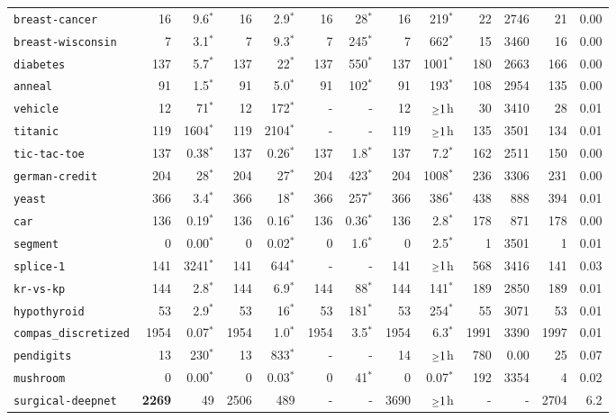 \begin{tabular}{lrrrrrrrrrrrr}
\texttt{breast-cancer} & 16 & 9.6$^*$ & 16 & 2.9$^*$ & 16 & 28$^*$ & 16 & 219$^*$ & 22 & 2746 & 21 & 0.00\\
\texttt{breast-wisconsin} & 7 & 3.1$^*$ & 7 & 9.3$^*$ & 7 & 245$^*$ & 7 & 662$^*$ & 15 & 3460 & 16 & 0.00\\
\texttt{diabetes} & 137 & 5.7$^*$ & 137 & 22$^*$ & 137 & 550$^*$ & 137 & 1001$^*$ & 180 & 2663 & 166 & 0.00\\
\texttt{anneal} & 91 & 1.5$^*$ & 91 & 5.0$^*$ & 91 & 102$^*$ & 91 & 193$^*$ & 108 & 2954 & 135 & 0.00\\
\texttt{vehicle} & 12 & 71$^*$ & 12 & 172$^*$ & - & - & 12 & $\mathsmaller{\geq}1$h & 30 & 3410 & 28 & 0.01\\
\texttt{titanic} & 119 & 1604$^*$ & 119 & 2104$^*$ & - & - & 119 & $\mathsmaller{\geq}1$h & 135 & 3501 & 134 & 0.01\\
\texttt{tic-tac-toe} & 137 & 0.38$^*$ & 137 & 0.26$^*$ & 137 & 1.8$^*$ & 137 & 7.2$^*$ & 162 & 2511 & 150 & 0.00\\
\texttt{german-credit} & 204 & 28$^*$ & 204 & 27$^*$ & 204 & 423$^*$ & 204 & 1008$^*$ & 236 & 3306 & 231 & 0.00\\
\texttt{yeast} & 366 & 3.4$^*$ & 366 & 18$^*$ & 366 & 257$^*$ & 366 & 386$^*$ & 438 & 888 & 394 & 0.01\\
\texttt{car} & 136 & 0.19$^*$ & 136 & 0.16$^*$ & 136 & 0.36$^*$ & 136 & 2.8$^*$ & 178 & 871 & 178 & 0.00\\
\texttt{segment} & 0 & 0.00$^*$ & 0 & 0.02$^*$ & 0 & 1.6$^*$ & 0 & 2.5$^*$ & 1 & 3501 & 1 & 0.01\\
\texttt{splice-1} & 141 & 3241$^*$ & 141 & 644$^*$ & - & - & 141 & $\mathsmaller{\geq}1$h & 568 & 3416 & 141 & 0.03\\
\texttt{kr-vs-kp} & 144 & 2.8$^*$ & 144 & 6.9$^*$ & 144 & 88$^*$ & 144 & 141$^*$ & 189 & 2850 & 189 & 0.01\\
\texttt{hypothyroid} & 53 & 2.9$^*$ & 53 & 16$^*$ & 53 & 181$^*$ & 53 & 254$^*$ & 55 & 3071 & 53 & 0.01\\
\texttt{compas\_discretized} & 1954 & 0.07$^*$ & 1954 & 1.0$^*$ & 1954 & 3.5$^*$ & 1954 & 6.3$^*$ & 1991 & 3390 & 1997 & 0.01\\
\texttt{pendigits} & 13 & 230$^*$ & 13 & 833$^*$ & - & - & 14 & $\mathsmaller{\geq}1$h & 780 & 0.00 & 25 & 0.07\\
\texttt{mushroom} & 0 & 0.00$^*$ & 0 & 0.03$^*$ & 0 & 41$^*$ & 0 & 0.07$^*$ & 192 & 3354 & 4 & 0.02\\
\texttt{surgical-deepnet} & \textbf{2269} & 49 & 2506 & 489 & - & - & 3690 & $\mathsmaller{\geq}1$h & - & - & 2704 & 6.2\\

\end{tabular}
